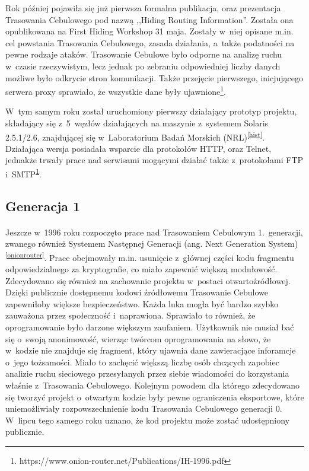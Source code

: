 Rok później pojawiła się już pierwsza formalna publikacja, oraz prezentacja Trasowania Cebulowego pod nazwą ,,Hiding Routing Information''. Została ona opublikowana na First Hiding Workshop 31 maja. Zostały w~niej opisane m.in. cel powstania Trasowania Cebulowego, zasada działania, a~także podatności na pewne rodzaje ataków. Trasowanie Cebulowe było odporne na analizę ruchu w~czasie rzeczywistym, lecz jednak po zebraniu odpowiedniej liczby danych możliwe było odkrycie stron komunikacji. Także przejęcie pierwszego, inicjującego serwera proxy sprawiało, że wszystkie dane były ujawnione\footnote{https://www.onion-router.net/Publications/IH-1996.pdf\label{hri}}.

W~tym samym roku został uruchomiony pierwszy działający prototyp projektu, składający się z~5~węzłów działających na maszynie z~systemem Solaris 2.5.1/2.6, znajdującej się w~Laboratorium Badań Morskich (NRL)\textsuperscript{\ref{hist}}. Działająca wersja posiadała wsparcie dla protokołów HTTP, oraz Telnet, jednakże trwały prace nad serwisami mogącymi działać także z~protokołami FTP i~SMTP\textsuperscript{\ref{hri}}.

\subsection{Generacja 1}\paragraph{}
Jeszcze w~1996 roku rozpoczęto prace nad Trasowaniem Cebulowym 1.~generacji, zwanego również Systemem Następnej Generacji (ang. Next Generation System)\textsuperscript{\ref{onionrouter}}. Prace obejmowały m.in. usunięcie z~głównej części kodu fragmentu odpowiedzialnego za kryptografie, co miało zapewnić większą modułowość. Zdecydowano się również na zachowanie projektu w~postaci otwartoźródłowej. Dzięki publicznie dostępnemu kodowi źródłowemu Trasowanie Cebulowe zapewniłoby większe bezpieczeństwo. Każda luka mogła być bardzo szybko zauważona przez społeczność i~naprawiona. Sprawiało to również, że oprogramowanie było darzone większym zaufaniem. Użytkownik nie musiał bać się o~swoją anonimowość, wierząc twórcom oprogramowania na słowo, że w~kodzie nie znajduje się fragment, który ujawnia dane zawieracjące inforamcje o~jego tożsamości. Miało to zachęcić większą liczbę osób chcących zapobiec analizie ruchu sieciowego przesyłanych przez siebie wiadomości do korzystania właśnie z~Trasowania Cebulowego. Kolejnym powodem dla którego zdecydowano się tworzyć projekt o~otwartym kodzie były pewne ograniczenia eksportowe, które uniemożliwiały rozpowszechnienie kodu Trasowania Cebulowego generacji 0. W~lipcu tego samego roku uznano, że kod projektu może zostać udostępniony publicznie.

